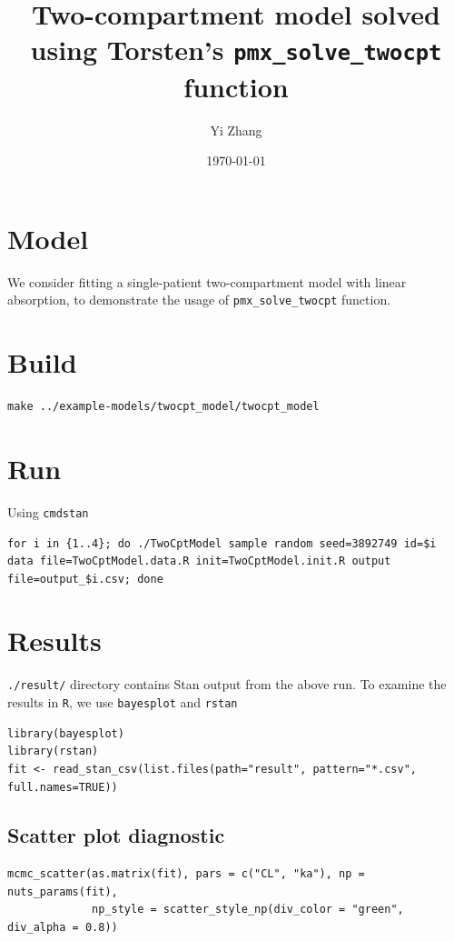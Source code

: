 \documentclass[11pt]{article}
\author{Yi Zhang}
\date{\today}
\title{Two-compartment model solved using Torsten's \texttt{pmx\_solve\_twocpt} function}
\begin{document}
\maketitle
\section{Model}
\label{sec:org58d8ed1}
We consider fitting a single-patient two-compartment model with linear absorption,
to demonstrate the usage of \texttt{pmx\_solve\_twocpt} function.
\section{Build}
\label{sec:orga0a39de}
\begin{verbatim}
make ../example-models/twocpt_model/twocpt_model
\end{verbatim}
\section{Run}
\label{sec:orgd4c8ebf}
Using \texttt{cmdstan}
\begin{verbatim}
for i in {1..4}; do ./TwoCptModel sample random seed=3892749 id=$i data file=TwoCptModel.data.R init=TwoCptModel.init.R output file=output_$i.csv; done
\end{verbatim}
\section{Results}
\label{sec:orgcaa9a49}
\texttt{./result/} directory contains Stan output from the above
run. To examine the results in \texttt{R}, we use \texttt{bayesplot} and \texttt{rstan}
\begin{verbatim}
library(bayesplot)
library(rstan)
fit <- read_stan_csv(list.files(path="result", pattern="*.csv", full.names=TRUE))
\end{verbatim}

\subsection{Scatter plot diagnostic}
\label{sec:org55e9152}
\begin{verbatim}
mcmc_scatter(as.matrix(fit), pars = c("CL", "ka"), np = nuts_params(fit),
             np_style = scatter_style_np(div_color = "green", div_alpha = 0.8))

\end{verbatim}
\end{document}
